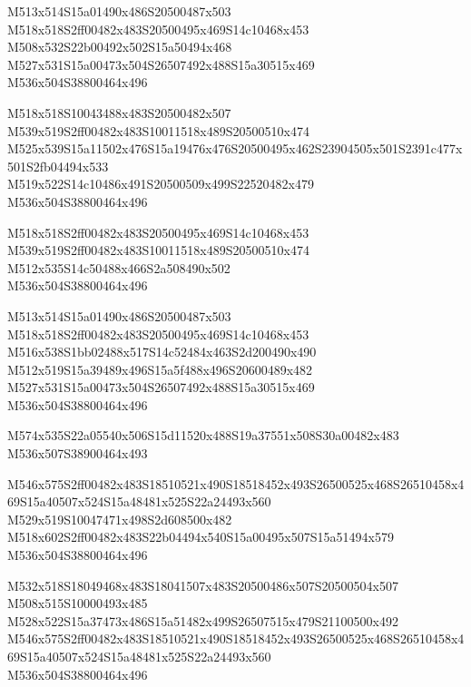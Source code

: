 \documentclass{article}
\begin{document}
\begin{multicols}{5}
\begin{center}
M513x514S15a01490x486S20500487x503 %
\\M518x518S2ff00482x483S20500495x469S14c10468x453 %
\\M508x532S22b00492x502S15a50494x468 %
\\M527x531S15a00473x504S26507492x488S15a30515x469 %
\\M536x504S38800464x496 %

M518x518S10043488x483S20500482x507 %
\\M539x519S2ff00482x483S10011518x489S20500510x474 %
\\M525x539S15a11502x476S15a19476x476S20500495x462S23904505x501S2391c477x501S2fb04494x533 %
\\M519x522S14c10486x491S20500509x499S22520482x479 %
\\M536x504S38800464x496 %

M518x518S2ff00482x483S20500495x469S14c10468x453 %
\\M539x519S2ff00482x483S10011518x489S20500510x474 %
\\M512x535S14c50488x466S2a508490x502 %
\\M536x504S38800464x496 %

M513x514S15a01490x486S20500487x503 %
\\M518x518S2ff00482x483S20500495x469S14c10468x453 %
\\M516x538S1bb02488x517S14c52484x463S2d200490x490 %
\\M512x519S15a39489x496S15a5f488x496S20600489x482 %
\\M527x531S15a00473x504S26507492x488S15a30515x469 %
\\M536x504S38800464x496 %

M574x535S22a05540x506S15d11520x488S19a37551x508S30a00482x483 %
\\M536x507S38900464x493 %

M546x575S2ff00482x483S18510521x490S18518452x493S26500525x468S26510458x469S15a40507x524S15a48481x525S22a24493x560 %
\\M529x519S10047471x498S2d608500x482 %
\\M518x602S2ff00482x483S22b04494x540S15a00495x507S15a51494x579 %
\\M536x504S38800464x496 %

M532x518S18049468x483S18041507x483S20500486x507S20500504x507 %
\\M508x515S10000493x485 %
\\M528x522S15a37473x486S15a51482x499S26507515x479S21100500x492 %
\\M546x575S2ff00482x483S18510521x490S18518452x493S26500525x468S26510458x469S15a40507x524S15a48481x525S22a24493x560 %
\\M536x504S38800464x496 %


\end{center}
\end{multicols}
\end{document}
